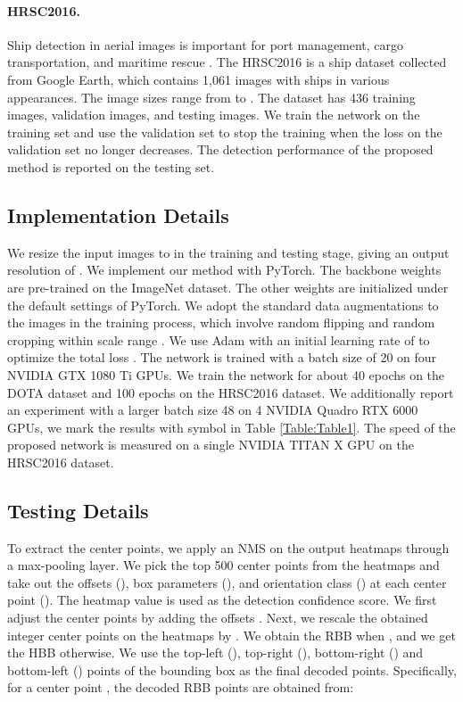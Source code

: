 \documentclass[10pt,twocolumn,letterpaper]{article}
\begin{document}
\noindent\paragraph{HRSC2016.} Ship detection in aerial images is important for port management, cargo transportation, and maritime rescue \cite{yang2018automatic}. The HRSC2016 \cite{icpram17} is a ship dataset collected from Google Earth, which contains 1,061 images with ships in various appearances. The image sizes range from  to . The dataset has 436 training images,  validation images, and  testing images. We train the network on the training set and use the validation set to stop the training when the loss on the validation set no longer decreases. The detection performance of the proposed method is reported on the testing set.



\subsection{Implementation Details}
We resize the input images to  in the training and testing stage, giving an output resolution of . We implement our method with PyTorch. The backbone weights are pre-trained on the ImageNet dataset. The other weights are initialized under the default settings of PyTorch. We adopt the standard data augmentations to the images in the training process, which involve random flipping and random cropping within scale range . We use Adam \cite{kingma2014adam} with an initial learning rate of  to optimize the total loss . The network is trained with a batch size of 20 on four NVIDIA GTX 1080 Ti GPUs. We train the network for about 40 epochs on the DOTA dataset and 100 epochs on the HRSC2016 dataset. We additionally report an experiment with a larger batch size 48 on 4 NVIDIA Quadro RTX 6000 GPUs, we mark the results with symbol  in Table \ref{Table:Table1}. The speed of the proposed network is measured on a single NVIDIA TITAN X GPU on the HRSC2016 dataset.



\subsection{Testing Details}
To extract the center points, we apply an NMS on the output heatmaps through a  max-pooling layer. We pick the top 500 center points from the heatmaps and take out the offsets (), box parameters (), and orientation class () at each center point (). The heatmap value is used as the detection confidence score. We first adjust the center points by adding the offsets . Next, we rescale the obtained integer center points on the heatmaps by . We obtain the RBB when , and we get the HBB otherwise. We use the top-left (), top-right (), bottom-right () and bottom-left () points of the bounding box as the final decoded points. Specifically, for a center point , the decoded RBB points are obtained from:
\end{document}
